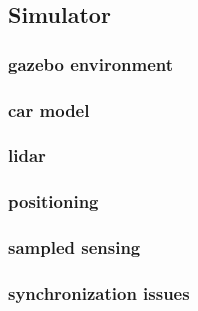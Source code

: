 \subsection{Simulator}
\subsubsection{gazebo environment}
\subsubsection{car model}
\subsubsection{lidar}
\subsubsection{positioning}
\subsubsection{sampled sensing}
\subsubsection{synchronization issues}



